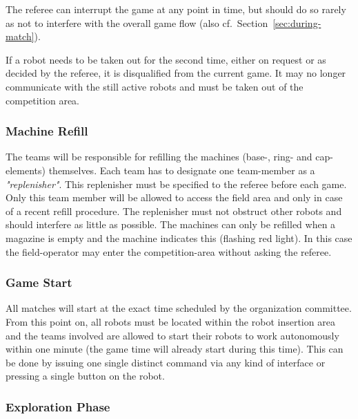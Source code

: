 \documentclass[12pt,twoside]{article}
\newcommand{\refsec}[1]{Section~\ref{#1}}
\begin{document}
The referee can interrupt the game at any point in time, but should do
so rarely as not to interfere with the overall game flow (also
cf.~\refsec{sec:during-match}).

If a robot needs to be taken out for the second time, either on
request or as decided by the referee, it is disqualified from the
current game. It may no longer communicate with the still active
robots and must be taken out of the competition area.


\subsubsection{Machine Refill}
\label{sec:machine-refill}

The teams will be responsible for refilling the machines (base-, ring- and cap-elements) themselves.
Each team has to designate one team-member as a \textit{"replenisher"}.
This replenisher must be specified to the referee before each game. 
Only this team member will be allowed to access the field area and only in case 
of a recent refill procedure.
The replenisher must not obstruct other robots and should interfere as little
as possible. 
The machines can only be refilled when a magazine is empty and the machine 
indicates this (flashing red light). In this case the field-operator may enter the 
competition-area without asking the referee.


\subsubsection{Game Start}
\label{sec:game-start}
%
All matches will start at the exact time scheduled by the organization
committee. From this point on, all robots must be located within the
robot insertion area and the teams involved are allowed to start their
robots to work autonomously within one minute (the game time will
already start during this time). This can be done by issuing one
single distinct command via any kind of interface or pressing a single
button on the robot.

\subsubsection{Exploration Phase}
\label{sec:expphase}
\end{document}
